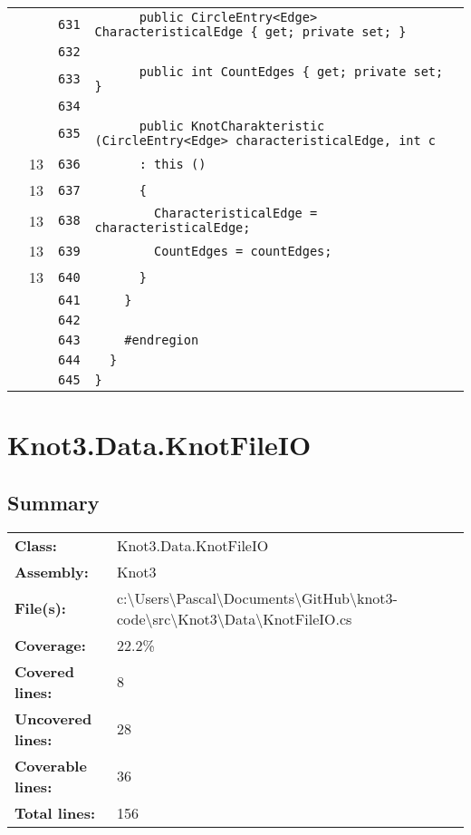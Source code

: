 \documentclass[a4paper,10pt]{article}
\begin{document}
\begin{longtable}[l]{lrrl}
\cellcolor{gray} &  & \verb~631~ & \verb~      public CircleEntry<Edge> CharacteristicalEdge { get; private set; }~\\
\cellcolor{gray} &  & \verb~632~ & \verb~~\\
\cellcolor{gray} &  & \verb~633~ & \verb~      public int CountEdges { get; private set; }~\\
\cellcolor{gray} &  & \verb~634~ & \verb~~\\
\cellcolor{gray} &  & \verb~635~ & \verb~      public KnotCharakteristic (CircleEntry<Edge> characteristicalEdge, int c~\\
\cellcolor{green} & 13 & \verb~636~ & \verb~      : this ()~\\
\cellcolor{green} & 13 & \verb~637~ & \verb~      {~\\
\cellcolor{green} & 13 & \verb~638~ & \verb~        CharacteristicalEdge = characteristicalEdge;~\\
\cellcolor{green} & 13 & \verb~639~ & \verb~        CountEdges = countEdges;~\\
\cellcolor{green} & 13 & \verb~640~ & \verb~      }~\\
\cellcolor{gray} &  & \verb~641~ & \verb~    }~\\
\cellcolor{gray} &  & \verb~642~ & \verb~~\\
\cellcolor{gray} &  & \verb~643~ & \verb~    #endregion~\\
\cellcolor{gray} &  & \verb~644~ & \verb~  }~\\
\cellcolor{gray} &  & \verb~645~ & \verb~}~\\
\end{longtable}
\newpage
\section{Knot3.Data.KnotFileIO}
\subsection{Summary}
\begin{longtable}[l]{ll}
\textbf{Class:} & Knot3.Data.KnotFileIO\\
\textbf{Assembly:} & Knot3\\
\textbf{File(s):} & \begin{minipage}[t]{12cm}{c:\textbackslash Users\textbackslash Pascal\textbackslash Documents\textbackslash GitHub\textbackslash knot3-code\textbackslash src\textbackslash Knot3\textbackslash Data\textbackslash KnotFileIO.cs}\end{minipage} \\
\textbf{Coverage:} & 22.2\%\\
\textbf{Covered lines:} & 8\\
\textbf{Uncovered lines:} & 28\\
\textbf{Coverable lines:} & 36\\
\textbf{Total lines:} & 156\\
\end{longtable}
\end{document}
